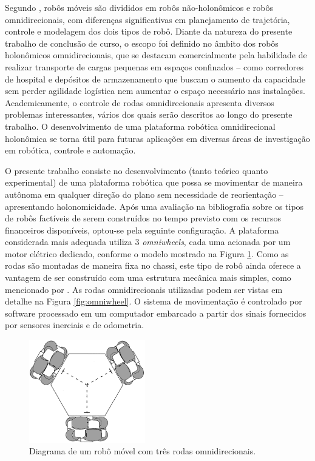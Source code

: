 Segundo \cite{lynch2017modern}, robôs móveis são divididos em robôs não-holonômicos e robôs omnidirecionais, com diferenças significativas em planejamento de trajetória, controle e modelagem dos dois tipos de robô. Diante da natureza do presente trabalho de conclusão de curso, o escopo foi definido no âmbito dos robôs holonômicos omnidirecionais, que se destacam comercialmente pela habilidade de realizar transporte de cargas pequenas em espaços confinados -- como corredores de hospital e depósitos de armazenamento que buscam o aumento da capacidade sem perder agilidade logística nem aumentar o espaço necessário nas instalações. Academicamente, o controle de rodas omnidirecionais apresenta diversos problemas interessantes, vários dos quais serão descritos ao longo do presente trabalho. O desenvolvimento de uma plataforma robótica omnidirecional holonômica se torna útil para futuras aplicações em diversas áreas de investigação em robótica, controle e automação.


O presente trabalho consiste no desenvolvimento (tanto teórico quanto experimental) de uma plataforma robótica que possa se movimentar de maneira autônoma em qualquer direção do plano sem necessidade de reorientação -- apresentando holonomicidade. Após uma avaliação na bibliografia sobre os tipos de robôs factíveis de serem construídos no tempo previsto com os recursos financeiros disponíveis, optou-se pela seguinte configuração. A plataforma considerada mais adequada utiliza 3 \emph{omniwheels}, cada uma acionada por um motor elétrico dedicado, conforme o modelo mostrado na Figura \ref{fig:tomr_ritter}. Como as rodas são montadas de maneira fixa no chassi, este tipo de robô ainda oferece a vantagem de ser construído com uma estrutura mecânica mais simples, como mencionado por \cite{siciliano2016springer}. As rodas omnidirecionais utilizadas podem ser vistas em detalhe na Figura \ref{fig:omniwheel}. O sistema de movimentação é controlado por software processado em um computador embarcado a partir dos sinais fornecidos por sensores inerciais e de odometria.

\begin{figure}[h]
  \centering
  \includegraphics[width = 0.45\textwidth]{imagens/tomr_ritter_mod}
  \caption{Diagrama de um robô móvel com três rodas omnidirecionais.}
  \label{fig:tomr_ritter}
\end{figure}

